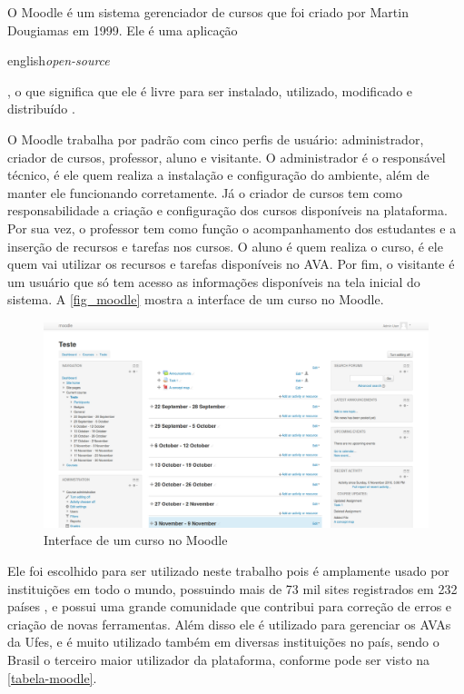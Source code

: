 \documentclass[
	12pt,				%
	openright,			%
	oneside,			%
	a4paper,			%
	english,			%
	french,				%
	spanish,			%
	brazil				%
	]{abntex2}
\begin{document}
O Moodle é um sistema gerenciador de cursos que foi criado por Martin Dougiamas em 1999. Ele é uma aplicação \begin{otherlanguage*}{english}\textit{open-source}\end{otherlanguage*}, o que significa que ele é livre para ser instalado, utilizado, modificado e distribuído \cite{Dougiamas2003}. 

O Moodle trabalha por padrão com cinco perfis de usuário: administrador, criador de cursos, professor, aluno e visitante. O administrador é o responsável técnico, é ele quem realiza a instalação e configuração do ambiente, além de manter ele funcionando corretamente. Já o criador de cursos tem como responsabilidade a criação e configuração dos cursos disponíveis na plataforma. Por sua vez, o professor tem como função o acompanhamento dos estudantes e a inserção de recursos e tarefas nos cursos. O aluno é quem realiza o curso, é ele quem vai utilizar os recursos e tarefas disponíveis no AVA. Por fim, o visitante é um usuário que só tem acesso as informações disponíveis na tela inicial do sistema. A \autoref{fig_moodle} mostra a interface de um curso no Moodle.


\begin{figure}[htb]
	\caption{\label{fig_moodle}Interface de um curso no Moodle}
	\begin{center}
		\includegraphics[scale=0.2]{moodle.png}
	\end{center}
\end{figure}


Ele foi escolhido para ser utilizado neste trabalho pois é amplamente usado por instituições em todo o mundo, possuindo mais de 73 mil sites registrados em 232 países \cite{MoodleStat2016}, e possui uma grande comunidade que contribui para correção de erros e criação de novas ferramentas. Além disso ele é utilizado para gerenciar os AVAs da Ufes, e é muito utilizado também em diversas instituições no país, sendo o Brasil o terceiro maior utilizador da plataforma, conforme pode ser visto na \autoref{tabela-moodle}.
\end{document}
